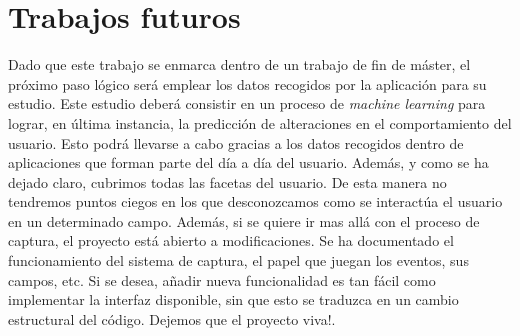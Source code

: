 \documentclass[12pt,a4paper,oneside]{book} %
\begin{document}
\section{Trabajos futuros}
Dado que este trabajo se enmarca dentro de un trabajo de fin de máster, el próximo paso lógico será emplear los datos recogidos por la aplicación para su estudio. 
\newline 
\newline 
Este estudio deberá consistir en un proceso de \textit{machine learning} para lograr, en última instancia, la predicción de alteraciones en el comportamiento del usuario. Esto podrá llevarse a cabo gracias a los datos recogidos dentro de aplicaciones que forman parte del día a día del usuario. Además, y como se ha dejado claro, cubrimos todas las facetas del usuario. De esta manera no tendremos puntos ciegos en los que desconozcamos como se interactúa el usuario en un determinado campo. 
\newline 
\newline 
Además, si se quiere ir mas allá con el proceso de captura, el proyecto está abierto a modificaciones. Se ha documentado el funcionamiento del sistema de captura, el papel que juegan los eventos, sus campos, etc. Si se desea, añadir nueva funcionalidad es tan fácil como implementar la interfaz disponible, sin que esto se traduzca en un cambio estructural del código. Dejemos que el proyecto viva!. 





\pagebreak
\thispagestyle{empty}
\pagestyle{empty}



\end{document}
